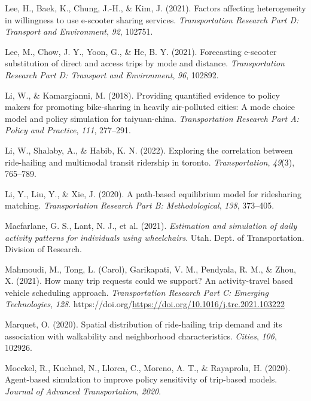\documentclass[fancy, masters]{byuthesis}
\newlength{\cslhangindent}
\newlength{\cslentryspacingunit} %
\newenvironment{CSLReferences}[2] %
 {%
  \setlength{\parindent}{0pt}
  \ifodd #1
  \let\oldpar\par
  \def\par{\hangindent=\cslhangindent\oldpar}
  \fi
  \setlength{\parskip}{#2\cslentryspacingunit}
 }%
 {}
\begin{document}
\begin{CSLReferences}{1}{0}
\leavevmode{}%
Lee, H., Baek, K., Chung, J.-H., \& Kim, J. (2021). Factors affecting heterogeneity in willingness to use e-scooter sharing services. \emph{Transportation Research Part D: Transport and Environment}, \emph{92}, 102751.

\leavevmode{}%
Lee, M., Chow, J. Y., Yoon, G., \& He, B. Y. (2021). Forecasting e-scooter substitution of direct and access trips by mode and distance. \emph{Transportation Research Part D: Transport and Environment}, \emph{96}, 102892.

\leavevmode{}%
Li, W., \& Kamargianni, M. (2018). Providing quantified evidence to policy makers for promoting bike-sharing in heavily air-polluted cities: A mode choice model and policy simulation for taiyuan-china. \emph{Transportation Research Part A: Policy and Practice}, \emph{111}, 277--291.

\leavevmode{}%
Li, W., Shalaby, A., \& Habib, K. N. (2022). Exploring the correlation between ride-hailing and multimodal transit ridership in toronto. \emph{Transportation}, \emph{49}(3), 765--789.

\leavevmode{}%
Li, Y., Liu, Y., \& Xie, J. (2020). A path-based equilibrium model for ridesharing matching. \emph{Transportation Research Part B: Methodological}, \emph{138}, 373--405.

\leavevmode{}%
Macfarlane, G. S., Lant, N. J., et al. (2021). \emph{Estimation and simulation of daily activity patterns for individuals using wheelchairs}. Utah. Dept. of Transportation. Division of Research.

\leavevmode{}%
Mahmoudi, M., Tong, L. (Carol), Garikapati, V. M., Pendyala, R. M., \& Zhou, X. (2021). How many trip requests could we support? An activity-travel based vehicle scheduling approach. \emph{Transportation Research Part C: Emerging Technologies}, \emph{128}. https://doi.org/\url{https://doi.org/10.1016/j.trc.2021.103222}

\leavevmode{}%
Marquet, O. (2020). Spatial distribution of ride-hailing trip demand and its association with walkability and neighborhood characteristics. \emph{Cities}, \emph{106}, 102926.

\leavevmode{}%
Moeckel, R., Kuehnel, N., Llorca, C., Moreno, A. T., \& Rayaprolu, H. (2020). Agent-based simulation to improve policy sensitivity of trip-based models. \emph{Journal of Advanced Transportation}, \emph{2020}.


\end{CSLReferences}
\end{document}
